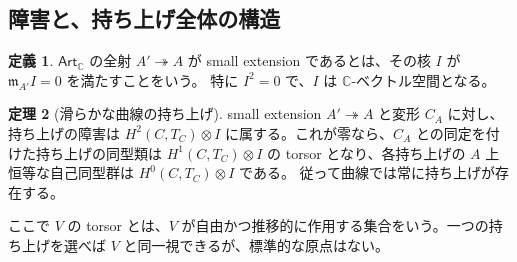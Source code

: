 \documentclass[dvipdfmx,a4paper,11pt]{article}
\theoremstyle{definition}
\newtheorem{thm}{定理}[section]
\newtheorem{dfn}[thm]{定義}
\newcommand{\C}{\mathbb C}\newcommand{\R}{\mathbb R}\newcommand{\Z}{\mathbb Z}\newcommand{\Q}{\mathbb Q}
\newcommand{\Art}{\mathsf{Art}_{\C}}
\begin{document}
\subsection{障害と、持ち上げ全体の構造}
\begin{dfn}
$\Art$ の全射 $A'\twoheadrightarrow A$ が small extension であるとは、その核 $I$ が $\mathfrak m_{A'}I=0$ を満たすことをいう。
特に $I^2=0$ で、$I$ は $\C$-ベクトル空間となる。
\end{dfn}
\begin{thm}[滑らかな曲線の持ち上げ]\label{thm:obstruction}
small extension $A'\twoheadrightarrow A$ と変形 $C_A$ に対し、持ち上げの障害は
$H^2(C,T_C)\otimes I$ に属する。これが零なら、$C_A$ との同定を付けた持ち上げの同型類は $H^1(C,T_C)\otimes I$ の torsor となり、各持ち上げの $A$ 上恒等な自己同型群は $H^0(C,T_C)\otimes I$ である。
従って曲線では常に持ち上げが存在する。
\end{thm}
ここで $V$ の torsor とは、$V$ が自由かつ推移的に作用する集合をいう。一つの持ち上げを選べば $V$ と同一視できるが、標準的な原点はない。
\end{document}
